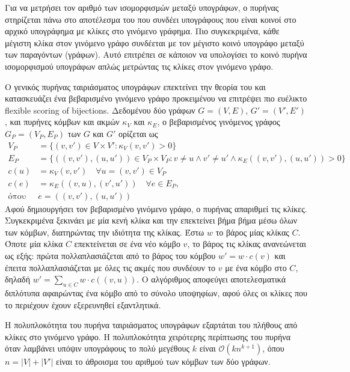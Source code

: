 Για να μετρήσει τον αριθμό των ισομορφισμών μεταξύ υπογράφων, ο πυρήνας στηρίζεται πάνω στο αποτέλεσμα του  \cite{levi1973note} που συνδέει υπογράφους που είναι κοινοί στο αρχικό υπογράφημα με κλίκες στο γινόμενο γράφημα.
Πιο συγκεκριμένα, κάθε μέγιστη κλίκα στον γινόμενο γράφο συνδέεται με τον μέγιστο κοινό υπογράφο μεταξύ των παραγόντων (γράφων).
Αυτό επιτρέπει σε κάποιον να υπολογίσει το κοινό πυρήνα ισομορφισμού υπογράφων απλώς μετρώντας τις κλίκες στον γινόμενο γράφο.

Ο γενικός πυρήνας ταιριάσματος υπογράφων επεκτείνει την θεορία του  και κατασκευάζει ένα βεβαρισμένο γινόμενο γράφο προκειμένου να επιτρέψει πιο ευέλικτο flexible scoring of bijections.
Δεδομένου δύο γράφων $G=(V,E)$, $G'=(V',E')$, και πυρήνες κόμβων και ακμών $\kappa_V$ και $\kappa_E$, ο βεβαρισμένος γινόμενος γράφος $G_P=(V_P, E_P)$ των $G$ και $G'$ ορίζεται ως
\begin{equation}
    \begin{split}
        V_P &= \{ (v,v') \in V \times V' : \kappa_V(v,v') > 0 \} \\
        E_P &= \{ ((v,v'),(u,u')) \in V_P \times V_P : v \neq u \wedge v' \neq u' \wedge \kappa_E((v,v'),(u,u')) > 0 \} \\
        c(u) &= \kappa_V(v,v') \quad \forall u=(v,v') \in V_P \\
        c(e) &= \kappa_E((v,u),(v',u')) \quad \forall e \in E_P, \\
        \text{όπου } &e=((v,v'),(u,u')) 
    \end{split}
\end{equation}
Αφού δημιουργήσει τον βεβαρισμένο γινόμενο γράφο, ο πυρήνας απαριθμεί τις κλίκες.
Συγκεκριμένα ξεκινάει με μία κενή κλίκα και την επεκτείνει βήμα βήμα μέσω όλων των κόμβων, διατηρώντας την ιδιότητα της κλίκας. 
Έστω $w$ το βάρος μίας κλίκας $C$.
Όποτε μία κλίκα $C$ επεκτείνεται σε ένα νέο κόμβο $v$, το βάρος τις κλίκας ανανεώνεται ως εξής: πρώτα πολλαπλασιάζεται από το βάρος του κόμβου $w' = w \cdot c(v)$ και έπειτα πολλαπλασιάζεται με όλες τις ακμές που συνδέουν το $v$ με ένα κόμβο στο $C$, δηλαδή $w' = \sum_{u \in C} w \cdot c((v,u))$.
Ο αλγόριθμος αποφεύγει αποτελεσματικά διπλότυπα αφαιρώντας ένα κόμβο από το σύνολο υποψηφίων, αφού όλες οι κλίκες που το περιέχουν έχουν εξερευνηθεί εξαντλητικά.

Η πολυπλοκότητα του πυρήνα ταιριάσματος υπογράφων εξαρτάται του πλήθους από κλίκες στο γινόμενο γράφο.
Η πολυπλοκότητα χειρότερης περίπτωσης του πυρήνα όταν λαμβάνει υπόψιν υπογράφους το πολύ μεγέθους $k$ είναι $\mathcal{O}(kn^{k+1})$, όπου $n=|V|+|V'|$ είναι το άθροισμα του αριθμού των κόμβων των δύο γράφων.

